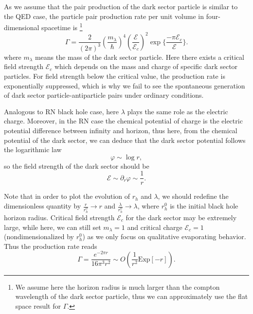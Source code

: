 \documentclass[a4paper,11pt]{article}
\begin{document}
As we assume that the pair production of the dark sector particle is similar to the QED case, the particle pair production rate per unit volume in four-dimensional spacetime is \footnote{We assume here the horizon radius is much larger than the compton wavelength of the dark sector particle, thus we can approximately use the flat space result for $\Gamma$. } \cite{Hiscock:1990ex,Xu:2019wak}
\begin{equation}
    \Gamma=\frac{2}{(2\pi)^{3}}\left(\frac{m_\lambda}{\hbar}\right)^4\left(\frac{\mathcal{E}}{\mathcal{E}_c}\right)^{2}\exp\biggl\{\frac{-\pi \mathcal{E}_c}{\mathcal{E}}\biggr\}.
\end{equation}
where $m_\lambda$ means the mass of the dark sector particle. Here there exists a critical field strength $\mathcal{E}_{c}$ which depends on the mass and charge of specific dark sector particles. For field strength below the critical value, the production rate is exponentially suppressed, which is why we fail to see the spontaneous generation of dark sector particle-antiparticle pairs under ordinary conditions. 

Analogous to RN black hole case, here $\lambda$ plays the same role as the electric charge. Moreover, in the RN case the chemical potential of charge is the electric potential difference between infinity and horizon, thus here, from the chemical potential of the dark sector, we can deduce that the dark sector potential follows the logarithmic law
\begin{equation}
    \varphi \sim \log r, 
\end{equation}
so the field strength of the dark sector should be
\begin{equation}
    \mathcal{E} \sim \partial_{r} \varphi \sim \frac{1}{r}.
\end{equation}

Note that in order to plot the evolution of $r_{h}$ and $\lambda$, we should redefine the dimensionless quantity by $\frac{r}{r^{0}_{h}} \to r $ and $ \frac{\lambda}{r_{h}^{0}} \to \lambda $, where $r_{h}^{0}$ is the initial black hole horizon radius. Critical field strength $\mathcal{E}_{c}$ for the dark sector may be extremely large, while here, we can still set $m_\lambda=1$ and critical charge $\mathcal{E}_c=1$ (nondimensionalized by $r_{h}^{0}$) as we only focus on qualitative evaporating behavior.
Thus the production rate reads
\begin{equation}
    \Gamma=\frac{e^{-2 \pi  r}}{16 \pi ^3 r^2} \sim O( \frac{1}{r^{2}} \mathrm{Exp}[-r]).
\end{equation}
\end{document}
